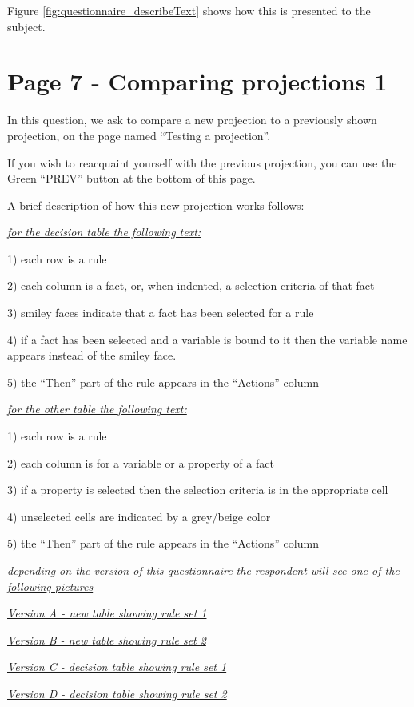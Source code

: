 Figure \ref{fig:questionnaire_describeText} shows how this is presented to the subject.

\section*{Page 7 - Comparing projections 1}

In this question, we ask to compare a new projection to a previously shown projection, on the page named ``Testing a projection''.

If you wish to reacquaint yourself with the previous projection, you can use the Green ``PREV''  button at the bottom of this page.

A brief description of how this new projection works follows:

\emph{\underline{for the decision table the following text:}}

1) each row is a rule

2) each column is a fact, or, when indented, a selection criteria of that fact

3) smiley faces indicate that a fact has been selected for a rule

4) if a fact has been selected and a variable is bound to it then the variable name appears instead of the smiley face.

5) the ``Then'' part of the rule appears in the ``Actions'' column


\emph{\underline{for the other table the following text:}}

1) each row is a rule

2) each column is for a variable or a property of a fact

3) if a property is selected then the selection criteria is in the appropriate cell

4) unselected cells are indicated by a grey/beige color

5) the ``Then'' part of the rule appears in the ``Actions'' column

\emph{\underline{depending on the version of this questionnaire the respondent will see one of the following pictures}}

\emph{\underline{Version A - new table showing rule set 1}}

\emph{\underline{Version B - new table showing rule set 2}}

\emph{\underline{Version C - decision table showing rule set 1}}

\emph{\underline{Version D - decision table showing rule set 2}}

